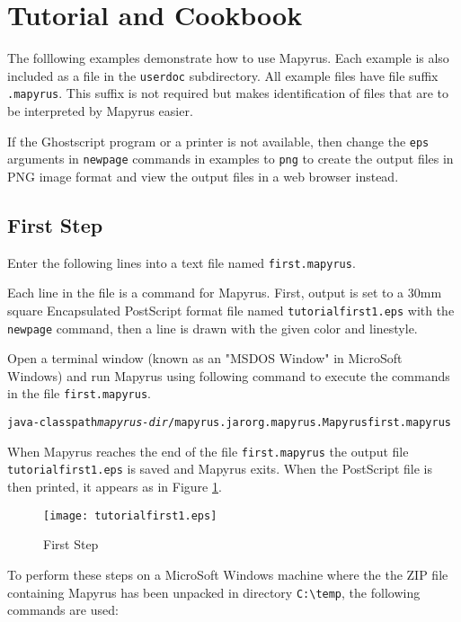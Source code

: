 
\section{Tutorial and Cookbook}

The folllowing examples demonstrate how to use Mapyrus.  Each example is also
included as a file in the \texttt{userdoc} subdirectory.  All example files
have file suffix \texttt{.mapyrus}.  This suffix is not required but makes
identification of files that are to be interpreted by Mapyrus easier.

If the Ghostscript program or a printer is not available, then change the
\texttt{eps} arguments in \texttt{newpage} commands in examples to \texttt{png}
to create the output files in PNG image format and view the output files in a
web browser instead.

\subsection{First Step}

Enter the following lines into a text file named \texttt{first.mapyrus}.



Each line in the file is a command for Mapyrus.  First, output is set to
a 30mm square Encapsulated PostScript format file named
\texttt{tutorialfirst1.eps} with the \texttt{newpage} command, then a
line is drawn with the given color and linestyle.

Open a terminal window (known as an "MSDOS Window" in MicroSoft Windows)
and run Mapyrus using following command to execute the
commands in the file \texttt{first.mapyrus}.

\begin{alltt}
java -classpath \textit{mapyrus-dir}/mapyrus.jar org.mapyrus.Mapyrus first.mapyrus
\end{alltt}

When Mapyrus reaches the end of the file \texttt{first.mapyrus}
the output file \texttt{tutorialfirst1.eps} is saved and Mapyrus exits.
When the PostScript file is then printed, it appears as in
Figure \ref{tutorialfirst1}.

\begin{figure}[htb]
\texttt{[image: tutorialfirst1.eps]}
\caption{First Step}
\label{tutorialfirst1}
\end{figure}

To perform these steps on a MicroSoft Windows machine where the
the ZIP file containing Mapyrus has been unpacked in directory
\texttt{C:\textbackslash{}temp},
the following commands are used:

